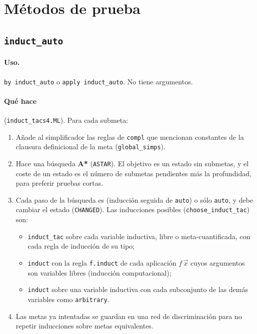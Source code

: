 \documentclass[11pt,a4paper]{article}
\newcommand{\isa}[1]{\texttt{#1}}
\theoremstyle{definition}
\theoremstyle{remark}
\begin{document}
\section{Métodos de prueba}

\subsection{\texttt{induct\_auto}}
\label{sec:induct_auto}

\paragraph{Uso.} \isa{by induct\_auto} o \isa{apply induct\_auto}. No tiene argumentos.

\paragraph{Qué hace} (\isa{induct\_tacs4.ML}).
Para cada submeta:
\begin{enumerate}[nosep]
  \item Añade al simplificador las reglas de \isa{compl} que mencionan constantes de
        la clausura definicional de la meta (\isa{global\_simps}).
  \item Hace una búsqueda \textbf{A*} (\isa{ASTAR}). El objetivo es un estado sin
        submetas, y el coste de un estado es el número de submetas pendientes más la
        profundidad, para preferir pruebas cortas.
  \item Cada paso de la búsqueda es (inducción seguida de \isa{auto}) o sólo \isa{auto}, y debe cambiar el estado
        (\isa{CHANGED}). Las inducciones posibles (\isa{choose\_induct\_tac}) son:
    \begin{itemize}[nosep]
      \item \isa{induct\_tac} sobre cada variable inductiva, libre o meta-cuantificada,
            con cada regla de inducción de su tipo;
      \item \isa{induct} con la regla \isa{f.induct} de cada aplicación $f\,\vec{x}$
            cuyos argumentos son variables libres (inducción computacional);
      \item \isa{induct} sobre una variable inductiva con cada subconjunto de las
            demás variables como \isa{arbitrary}.
    \end{itemize}
  \item Las metas ya intentadas se guardan en una red de discriminación para no
        repetir inducciones sobre metas equivalentes.
\end{enumerate}
\end{document}
